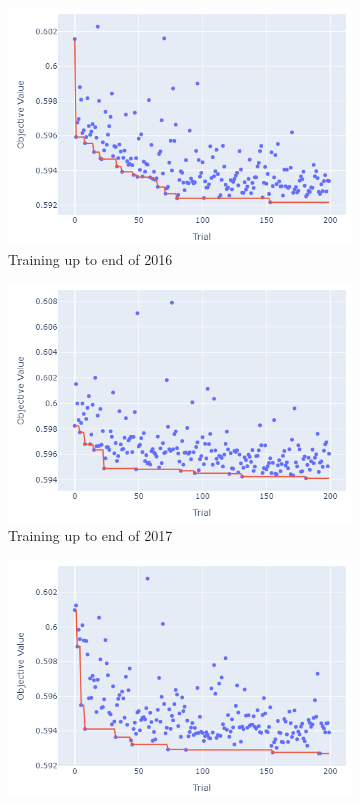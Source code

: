 \documentclass[12pt,twoside]{report}
\begin{document}
\begin{figure}[htb]
\centering
\captionsetup{justification=centering}
\begin{subfigure}{.33\linewidth}
  \centering
  \includegraphics[width=0.95\linewidth]{figures/va_lightgbm_cutoff_2016.png}
  \caption{Training up to end of 2016}
\end{subfigure}%
\begin{subfigure}{.33\linewidth}
  \centering
  \includegraphics[width=0.95\linewidth]{figures/va_lightgbm_cutoff_2017.png}
  \caption{Training up to end of 2017}
\end{subfigure}%
\begin{subfigure}{.33\linewidth}
  \centering
  \includegraphics[width=0.95\linewidth]{figures/va_lightgbm_cutoff_2018.png}

\end{subfigure}
\end{figure}
\end{document}
